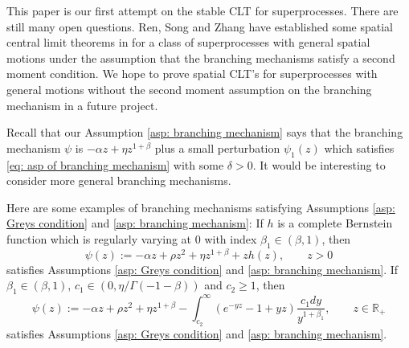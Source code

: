\documentclass[12pt,a4paper]{amsart}
\theoremstyle{plain}
\theoremstyle{definition}
\numberwithin{equation}{section}
\begin{document}
This paper is our first attempt on the stable CLT for superprocesses.
There are still many open questions.
Ren, Song and Zhang have established some spatial  central limit theorems in \cite{RenSongZhang2015Central} for a class of superprocesses with general spatial motions under the assumption that the branching mechanisms satisfy a second moment condition.
We hope to prove spatial CLT's for superprocesses with general motions without the second moment assumption on the branching mechanism in a future project.

Recall that our Assumption \ref{asp: branching mechanism} says that the branching mechanism $\psi$ is $-\alpha z +\eta z^{1+\beta}$ plus a small perturbation
$\psi_1(z)$
which satisfies \eqref{eq: asp of branching mechanism} with some $\delta>0$.
It would be interesting to consider more general branching mechanisms.

Here are some examples of branching mechanisms satisfying Assumptions \ref{asp: Greys condition} and \ref{asp: branching mechanism}:
If $h$ is a complete Bernstein function which is regularly varying at 0 with index $\beta_1\in (\beta, 1)$, then
\[
  \psi(z)
  := -\alpha z + \rho z^2+\eta z^{1+\beta}+zh(z)
  , \qquad z>0
\]
satisfies Assumptions \ref{asp: Greys condition} and \ref{asp: branching mechanism}.
If $\beta_1\in (\beta, 1)$, $c_1\in (0, \eta/\Gamma(-1-\beta))$ and $c_2\ge 1$, then
\[
  \psi(z)
  :=-\alpha z + \rho z^2+\eta z^{1+\beta}-\int^\infty_{c_2} (e^{-yz}-1+yz)\frac{c_1dy}{y^{1+\beta_1}}
  , \qquad z\in \mathbb R_+
\]
satisfies Assumptions \ref{asp: Greys condition} and \ref{asp: branching mechanism}.
\end{document}

